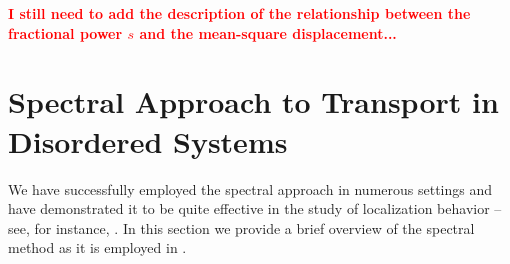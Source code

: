 \documentclass[final,1p,times]{elsarticle}
\newcommand{\no}{\noindent}
\theoremstyle{remark}
\theoremstyle{definition}
\newcommand{\josh}[1]{\textcolor{red}{\textbf{#1}}}
\begin{document}



\vspace{3mm}

\no\josh{I still need to add the description of the relationship between the fractional power $s$ and the mean-square displacement...}

\section{Spectral Approach to Transport in Disordered Systems}

We have successfully employed the spectral approach in numerous settings and have demonstrated it to be quite effective in the study of localization behavior -- see, for instance, \cite{Liaw2013,1751-8121-47-30-305202,
2053-1591-3-12-125904,PhysRevB.96.235408,kostadinova2018transport}. In this section we provide a brief overview of the spectral method as it is employed in \cite{Liaw2013}. 




\end{document}

